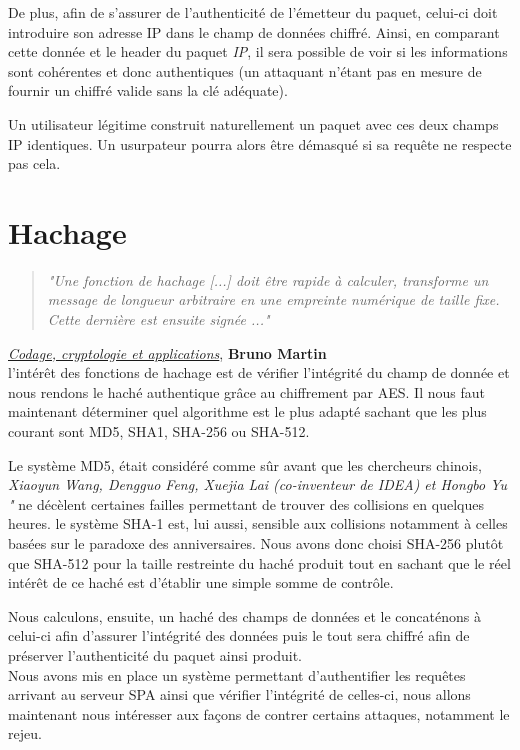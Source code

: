 De plus, afin de s'assurer de l'authenticité de l'émetteur du paquet, celui-ci doit introduire son adresse IP dans le champ de données chiffré. Ainsi, en comparant cette donnée et le header du paquet \emph{IP}, il sera possible de voir si les informations sont cohérentes et donc authentiques (un attaquant n'étant pas en mesure de fournir un chiffré valide sans la clé adéquate).

Un utilisateur légitime construit naturellement un paquet avec ces deux champs IP identiques. Un usurpateur pourra alors être démasqué si sa requête ne respecte pas cela.

\section{Hachage}
\begin{quotation}
\emph{"Une fonction de hachage [...] doit être rapide à calculer, transforme un message de longueur arbitraire en une empreinte numérique de taille fixe. Cette dernière est ensuite signée ..."}
\end{quotation}
\underline{\emph{Codage, cryptologie et applications}}, \textbf{Bruno Martin}\\

l'intérêt des fonctions de hachage est de vérifier l'intégrité du champ de donnée et nous rendons le haché authentique grâce au chiffrement par AES.
Il nous faut maintenant déterminer quel algorithme est le plus adapté sachant que les plus courant sont MD5, SHA1, SHA-256 ou SHA-512.\newline

Le système MD5, était considéré comme sûr avant que les chercheurs chinois, \emph{Xiaoyun Wang, Dengguo Feng, Xuejia Lai (co-inventeur de IDEA) et Hongbo Yu "} ne décèlent certaines failles permettant de trouver des collisions en quelques heures.
le système SHA-1 est, lui aussi, sensible aux collisions notamment à celles basées sur le paradoxe des anniversaires.
Nous avons donc choisi SHA-256 plutôt que SHA-512 pour la taille restreinte du haché produit tout en sachant que le réel intérêt de ce haché est d'établir une simple somme de contrôle.\newline

Nous calculons, ensuite, un haché des champs de données et le concaténons à celui-ci afin d'assurer l'intégrité des données puis le tout sera chiffré afin de préserver l'authenticité du paquet ainsi produit.\\

Nous avons mis en place un système permettant d'authentifier les requêtes arrivant au serveur SPA ainsi que vérifier l'intégrité de celles-ci, nous allons maintenant nous intéresser aux façons de contrer certains attaques, notamment le rejeu.